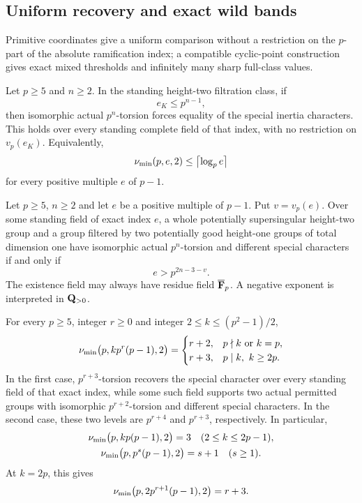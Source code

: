 \subsection{Uniform recovery and exact wild bands}
Primitive coordinates give a uniform comparison without a restriction on the $p$-part of the absolute ramification index; a compatible cyclic-point construction gives exact mixed thresholds and infinitely many sharp full-class values.

\begin{theorem}\label{thm:all-index-upper}
Let $p\ge5$ and $n\ge2$. In the standing height-two filtration class, if
\[
                           e_K\le p^{n-1},
\]
then isomorphic actual $p^n$-torsion forces equality of the special inertia characters. This holds over every standing complete field of that index, with no restriction on $v_p(e_K)$. Equivalently,
\[
 \nu_{\min}(p,e,2)\le\left\lceil\log_p e\right\rceil
\]
for every positive multiple $e$ of $p-1$.
\end{theorem}

\begin{theorem}\label{thm:mixed-all-indices}
Let $p\ge5$, $n\ge2$ and let $e$ be a positive multiple of $p-1$. Put $v=v_p(e)$. Over some standing field of exact index $e$, a whole potentially supersingular height-two group and a group filtered by two potentially good height-one groups of total dimension one have isomorphic actual $p^n$-torsion and different special characters if and only if
\[
                              e>p^{2n-3-v}.
\]
The existence field may always have residue field $\overline{\mathbf F}_p$. A negative exponent is interpreted in $\mathbf Q_{>0}$.
\end{theorem}

\begin{theorem}\label{thm:wild-bands-exact}
For every $p\ge5$, integer $r\ge0$ and integer $2\le k\le(p^2-1)/2$,
\[
 \nu_{\min}\bigl(p,kp^r(p-1),2\bigr)=
 \begin{cases}
 r+2,&p\nmid k\ \text{or }k=p,\\
 r+3,&p\mid k,\ k\ge2p.
 \end{cases}
\]
In the first case, $p^{r+3}$-torsion recovers the special character over every standing field of that exact index, while some such field supports two actual permitted groups with isomorphic $p^{r+2}$-torsion and different special characters. In the second case, these two levels are $p^{r+4}$ and $p^{r+3}$, respectively. In particular,
\[
 \begin{gathered}
 \nu_{\min}\bigl(p,kp(p-1),2\bigr)=3\quad(2\le k\le2p-1),\\
 \nu_{\min}\bigl(p,p^s(p-1),2\bigr)=s+1\quad(s\ge1).
 \end{gathered}
\]
At $k=2p$, this gives
\[
 \nu_{\min}\bigl(p,2p^{r+1}(p-1),2\bigr)=r+3.
\]
\end{theorem}

